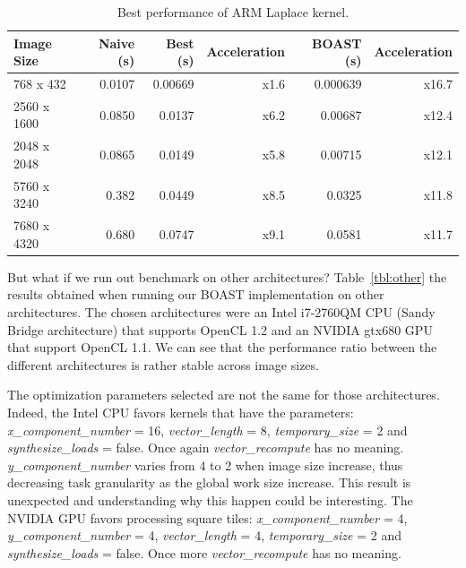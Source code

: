 \documentclass[11pt, a4paper, twoside]{montblanc}
\begin{document}
\begin{table}
\centering
\begin{tabular}{|l|r|r|r|r|r|}
\hline
Image Size  & Naive (s) & Best (s) & Acceleration & BOAST (s) & Acceleration \\
\hline
768 x 432   & 0.0107    & 0.00669  & x1.6         & 0.000639  & x16.7 \\
\hline
2560 x 1600 & 0.0850    & 0.0137   & x6.2         & 0.00687   & x12.4 \\
\hline
2048 x 2048 & 0.0865    & 0.0149   & x5.8         & 0.00715   & x12.1 \\
\hline
5760 x 3240 & 0.382     & 0.0449   & x8.5         & 0.0325    & x11.8 \\
\hline
7680 x 4320 & 0.680     & 0.0747   & x9.1         & 0.0581    & x11.7 \\
\hline
\end{tabular}
\caption{Best performance of ARM Laplace kernel.}
\label{tbl:ARM}
\end{table}

But what if we run out benchmark on other architectures? Table~\ref{tbl:other}
the results obtained when running our BOAST implementation on other
architectures. The chosen architectures were an Intel i7-2760QM CPU (Sandy
Bridge architecture) that supports OpenCL 1.2 and an NVIDIA gtx680 GPU that
support OpenCL 1.1. We can see that the performance ratio between the different
architectures is rather stable across image sizes.

The optimization parameters selected are not the same for those architectures.
Indeed, the Intel CPU favors kernels that have the parameters:
\textit{x\_component\_number} = 16,
\textit{vector\_length} = 8,
\textit{temporary\_size} = 2 and \textit{synthesize\_loads} = false. Once again
\textit{vector\_recompute} has no meaning. \textit{y\_component\_number} varies
from 4 to 2 when image size increase, thus decreasing task granularity as the
global work size increase. This result is unexpected and understanding why this
happen could be interesting. The NVIDIA GPU favors processing square tiles:
\textit{x\_component\_number} = 4, \textit{y\_component\_number} = 4,
\textit{vector\_length} = 4, \textit{temporary\_size} = 2 and
\textit{synthesize\_loads} = false. Once more \textit{vector\_recompute} has no
meaning.
\end{document}
